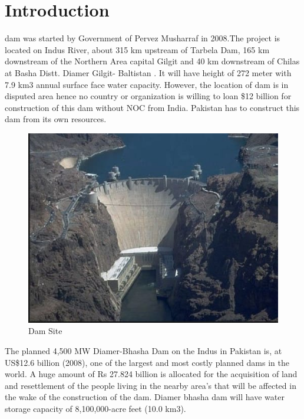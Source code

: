 \documentclass[11pt, journal,letterpaper,compsoc]{IEEEtran}
\begin{document}
\IEEEpeerreviewmaketitle

\section{Introduction}
  dam was started by Government of Pervez Musharraf in 2008.The project is located on Indus River, about 315 km upstream of Tarbela Dam, 165 km downstream of the
Northern Area capital Gilgit and 40 km downstream of Chilas at Basha Distt. Diamer Gilgit- Baltistan \cite{singh2013gilgit}. It will have height of 272 meter with 7.9 km3 annual surface face water capacity. However, the location of dam is in disputed area hence no country or organization is willing to
loan \$12 billion for construction of this dam without NOC from India. Pakistan has to construct this dam from its own resources.

\begin{figure} 
\includegraphics[width=\linewidth]{images/dam}
\caption{Dam Site}
\label{fig:dam}
\end{figure}


The planned 4,500 MW Diamer-Bhasha Dam on the Indus in Pakistan is, at US\$12.6 billion (2008), one of the largest and most costly planned dams in the world. A huge amount of Rs 27.824 billion is allocated for the acquisition of land and resettlement of the people living in the nearby area’s that will be affected in the wake of the construction of the dam. Diamer bhasha dam will have water storage capacity of 8,100,000-acre feet (10.0 km3). 
\end{document}
